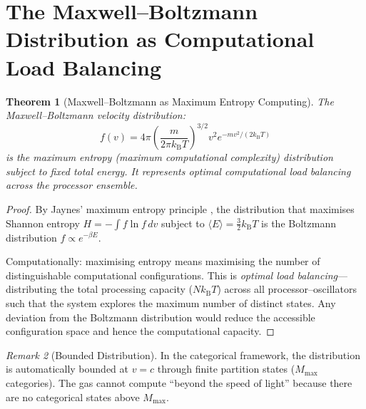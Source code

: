 \documentclass[twocolumn,10pt,a4paper]{article}
\theoremstyle{plain}
\newtheorem{theorem}{Theorem}[section]
\theoremstyle{definition}
\theoremstyle{remark}
\newtheorem{remark}[theorem]{Remark}
\newcommand{\kB}{k_{\mathrm{B}}}
\begin{document}
\section{The Maxwell--Boltzmann Distribution as Computational Load Balancing}
\label{sec:maxwell_computation}

\begin{theorem}[Maxwell--Boltzmann as Maximum Entropy Computing]
\label{thm:maxwell_compute}
The Maxwell--Boltzmann velocity distribution:
\begin{equation}
    f(v) = 4\pi\left(\frac{m}{2\pi\kB T}\right)^{3/2} v^2 e^{-mv^2/(2\kB T)}
\end{equation}
is the maximum entropy (maximum computational complexity) distribution subject to fixed total energy. It represents optimal computational load balancing across the processor ensemble.
\end{theorem}

\begin{proof}
By Jaynes' maximum entropy principle \cite{jaynes1957}, the distribution that maximises Shannon entropy $H = -\int f \ln f \, dv$ subject to $\langle E \rangle = \tfrac{3}{2}\kB T$ is the Boltzmann distribution $f \propto e^{-\beta E}$.

Computationally: maximising entropy means maximising the number of distinguishable computational configurations. This is \emph{optimal load balancing}---distributing the total processing capacity ($N\kB T$) across all processor--oscillators such that the system explores the maximum number of distinct states. Any deviation from the Boltzmann distribution would reduce the accessible configuration space and hence the computational capacity.
\end{proof}

\begin{remark}[Bounded Distribution]
In the categorical framework, the distribution is automatically bounded at $v = c$ through finite partition states ($M_{\max}$ categories). The gas cannot compute ``beyond the speed of light'' because there are no categorical states above $M_{\max}$.
\end{remark}
\end{document}
